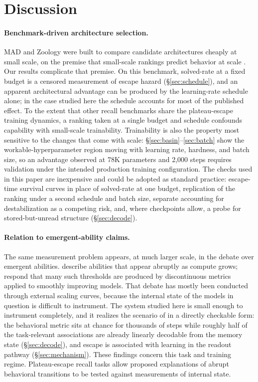 \documentclass[11pt]{article}
\begin{document}
\section{Discussion}
\label{sec:discussion}

\paragraph{Benchmark-driven architecture selection.} MAD and Zoology were built to
compare candidate architectures cheaply at small scale, on the premise that
small-scale rankings predict behavior at scale \citep{poli2024mad,arora2023zoology}.
Our results complicate that premise. On this benchmark, solved-rate at a fixed
budget is a censored measurement of escape hazard (\S\ref{sec:schedule}), and an
apparent architectural advantage can be produced by the learning-rate schedule
alone; in the case studied here the schedule accounts for most of the published
effect. To the extent that other recall benchmarks share the plateau-escape
training dynamics, a ranking taken at a single budget and schedule confounds
capability with small-scale trainability. Trainability is also the property most
sensitive to the changes that come with scale:
\S\ref{sec:basin}--\ref{sec:batch} show the workable-hyperparameter region moving
with learning rate, hardness, and batch size, so an advantage observed at 78K parameters
and 2{,}000 steps requires
validation under the intended production training configuration. The checks used in this paper are
inexpensive and could be adopted as standard practice: escape-time survival curves
in place of solved-rate at one budget, replication of the ranking under a second
schedule and batch size, separate accounting for destabilization as a competing risk,
and, where checkpoints allow, a probe for stored-but-unread
structure (\S\ref{sec:decode}).

\paragraph{Relation to emergent-ability claims.} The same measurement problem
appears, at much larger scale, in the debate over emergent abilities.
\citet{wei2022emergent} describe abilities that appear abruptly as compute grows;
\citet{schaeffer2023mirage} respond that many such thresholds are produced by
discontinuous metrics applied to smoothly improving models. That debate has mostly
been conducted through external scaling curves, because the internal state of the
models in question is difficult to instrument. The system studied here is small
enough to instrument completely, and it realizes the scenario of
\citet{schaeffer2023mirage} in a directly checkable form: the behavioral metric
sits at chance for thousands of steps while roughly half of the task-relevant
associations are already linearly decodable from the memory state
(\S\ref{sec:decode}), and escape is associated with learning in the readout pathway
(\S\ref{sec:mechanism}). These findings concern this task and training regime.
Plateau-escape recall tasks allow proposed explanations of abrupt behavioral
transitions to be tested against measurements of internal state.
\end{document}
